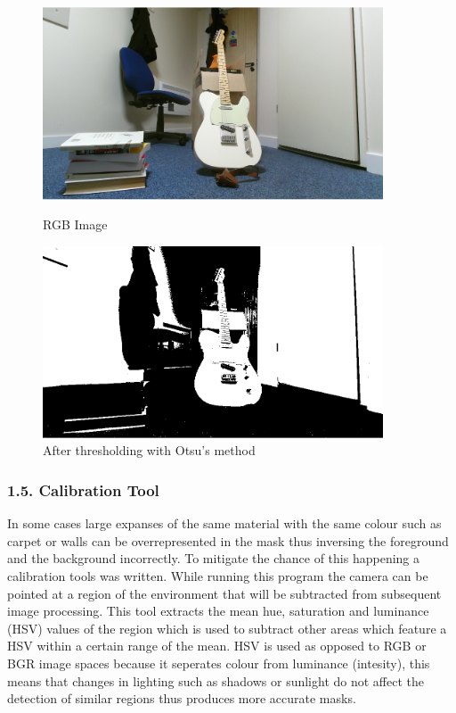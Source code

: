 \documentclass{mproj}
\begin{document}
\begin{figure}
    \centering
    \begin{minipage}{0.45\textwidth}
        \centering
        \includegraphics[width=0.9\textwidth]{images/basic.png} %
        \caption{RGB Image}
    \end{minipage}\hfill
    \begin{minipage}{0.45\textwidth}
        \centering
        \includegraphics[width=0.9\textwidth]{images/otsu.png} %
        \caption{After thresholding with Otsu's method}
    \end{minipage}
\end{figure}


\subsubsection{1.5. Calibration Tool}

In some cases large expanses of the same material with the same colour such as carpet or walls can be overrepresented in the mask thus inversing the foreground and the background incorrectly. To mitigate the chance of this happening a calibration tools was written. While running this program the camera can be pointed at a region of the environment that will be subtracted from subsequent image processing. This tool extracts the mean hue, saturation and luminance (HSV) values of the region which is used to subtract other areas which feature a HSV within a certain range of the mean. HSV is used as opposed to RGB or BGR image spaces because it seperates colour from luminance (intesity), this means that changes in lighting such as shadows or sunlight do not affect the detection of similar regions thus produces more accurate masks. 
\end{document}
